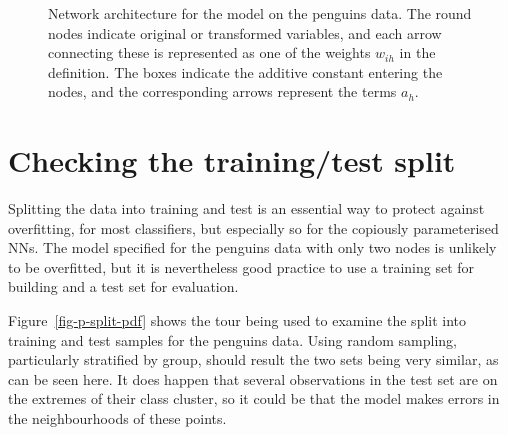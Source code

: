\documentclass[
  letterpaper,
]{krantz}
\begin{document}
\begin{figure}


\caption{\label{fig-nn-diagram}Network architecture for the model on the
penguins data. The round nodes indicate original or transformed
variables, and each arrow connecting these is represented as one of the
weights \(w_{ih}\) in the definition. The boxes indicate the additive
constant entering the nodes, and the corresponding arrows represent the
terms \(a_h\).}

\end{figure}%

\section{Checking the training/test
split}\label{checking-the-trainingtest-split}


Splitting the data into training and test is an essential way to protect
against overfitting, for most classifiers, but especially so for the
copiously parameterised NNs. The model specified for the penguins data
with only two nodes is unlikely to be overfitted, but it is nevertheless
good practice to use a training set for building and a test set for
evaluation.

Figure~\ref{fig-p-split-pdf} shows the tour being used to examine the
split into training and test samples for the penguins data. Using random
sampling, particularly stratified by group, should result the two sets
being very similar, as can be seen here. It does happen that several
observations in the test set are on the extremes of their class cluster,
so it could be that the model makes errors in the neighbourhoods of
these points.
\end{document}
